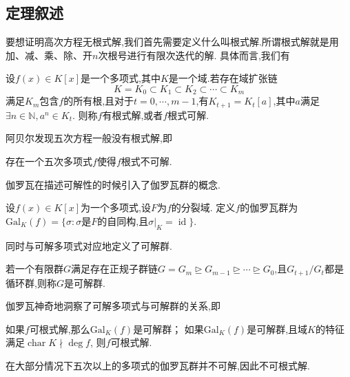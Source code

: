 \documentclass[main]{subfiles}
\newcommand{\gal}{\mathrm{Gal}}
\newcommand{\id}{\mathop{\mathrm{id}}}
\renewcommand{\char}{\mathop{\mathrm{char}}}
\begin{document}
\subsection{定理叙述}
要想证明高次方程无根式解,我们首先需要定义什么叫根式解.所谓根式解就是用加、减、乘、除、开\(n\)次根号进行有限次迭代的解.
具体而言,我们有
\begin{definition}\label{def:1}
	设\(f( x) \in K[ x]\)是一个多项式,其中\(K\)是一个域.若存在域扩张链
	\[
		K=K_0 \subset K_1 \subset K_2 \subset \cdots \subset K_m
	\]
	满足\(K_m\)包含\(f\)的所有根,且对于\(t=0,\cdots,m-1\),有\(K_{t+1}=K_t[ a]\),其中\(a\)满足\(\exists n \in \mathbb{N},a^n \in K_t\).
	则称\(f\)有根式解,或者\(f\)根式可解.
\end{definition}
阿贝尔发现五次方程一般没有根式解,即
\begin{theorem}\label{the:1}
	存在一个五次多项式\(f\)使得\(f\)根式不可解.
\end{theorem}
伽罗瓦在描述可解性的时候引入了伽罗瓦群的概念.
\begin{definition}\label{def:2}
	设\(f( x) \in K[ x]\)为一个多项式,设\(F\)为\(f\)的分裂域.
	定义\(f\)的伽罗瓦群为\(\gal_K( f)=\{ \sigma :\sigma \text{是}F \text{的自同构,且}\sigma|_K=\id\}\).
\end{definition}
同时与可解多项式对应地定义了可解群.
\begin{definition}\label{def:3}
	若一个有限群\(G\)满足存在正规子群链\(G=G_m \unrhd G_{m-1} \unrhd \cdots \unrhd G_0\),且\(G_{t+1} / G_t\)都是循环群,则称\(G\)是可解群.
\end{definition}
伽罗瓦神奇地洞察了可解多项式与可解群的关系,即
\begin{theorem}\label{the:2}
	如果\(f\)可根式解,那么\(\gal_K( f)\)是可解群；
	如果\(\gal_K( f)\)是可解群,且域\(K\)的特征满足\(\char K \nmid \deg f\), 则\(f\)可根式解.
\end{theorem}
在大部分情况下五次以上的多项式的伽罗瓦群并不可解,因此不可根式解.
\end{document}

